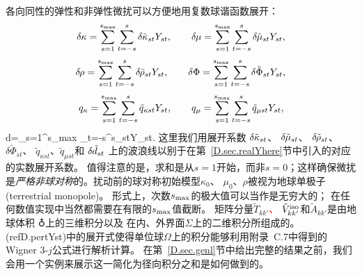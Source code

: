 各向同性的弹性和非弹性微扰可以方便地用复数球谐函数展开：
\begin{displaymath}
\delta\hspace{-0.1 mm}\kappa=\sum_{s=1}^{s_{\rm max}}
\sum_{t=-s}^s\delta\hspace{-0.1 mm}\tilde{\kappa}_{st}Y_{st},\qquad
\delta\hspace{-0.2 mm}\mu=\sum_{s=1}^{s_{\rm max}}
\sum_{t=-s}^s\delta\hspace{-0.2 mm}\tilde{\mu}_{st}Y_{st},
\end{displaymath}
\begin{displaymath}
\delta\hspace{-0.3 mm}\rho=\sum_{s=1}^{s_{\rm max}}
\sum_{t=-s}^s\delta\hspace{-0.3 mm}\tilde{\rho}_{st}Y_{st},\qquad
\delta\Phi=\sum_{s=1}^{s_{\rm max}}
\sum_{t=-s}^s\delta\tilde{\Phi}_{st}Y_{st},
\end{displaymath}
\begin{displaymath}
q_{\kappa}=\sum_{s=1}^{s_{\rm max}}
\sum_{t=-s}^s\tilde{q}_{\kappa st}Y_{st},\qquad
q_{\mu}=\sum_{s=1}^{s_{\rm max}}
\sum_{t=-s}^s\tilde{q}_{\mu st}Y_{st},
\end{displaymath}
\eq \label{D.pertYst}
\qquad\qquad\qquad
\delta\hspace{-0.1 mm}d=\sum_{s=1}^{s_{\rm max}}
\sum_{t=-s}^s\delta\hspace{-0.1 mm}_{st}Y_{st}.
\en
这里我们用展开系数
$\delta\hspace{-0.1 mm}\tilde{\kappa}_{st}$、
$\delta\hspace{-0.2 mm}\tilde{\mu}_{st}$、
$\delta\hspace{-0.3 mm}\tilde{\rho}_{st}$、
$\delta\tilde{\Phi}_{st}$、
$\tilde{q}_{\kappa st}$、$\tilde{q}_{\mu st}$和
$\delta\hspace{-0.1 mm}\tilde{d}_{st}$
上的波浪线以别于在第~\ref{D.sec.realYhere}节中引入的对应的实数展开系数。
值得注意的是，求和是从$s=1$开始，而非$s=0$；这样确保微扰是{\em 严格非球对称\/}的。扰动前的球对称初始模型$\kappa_0$、
$\mu_0$、$\rho$被视为地球单极子(terrestrial monopole)。
%
形式上，次数$s_{\rm max}$的极大值可以当作是无穷大的；
在任何数值实现中当然都需要在有限的$s_{\rm max}$值截断。
矩阵分量$\tilde{T}_{kk'}$\textcolor{red}{、}
$\tilde{V}_{kk'}^{\rm iso}$和$\tilde{A}_{kk'}$是由地球体积 $\earth$上的三维积分以及
在内、外界面$\Sigma$上的二维积分所组成的。
(ref{D.pertYst})中的展开式使得单位球$\Omega$上的积分能够利用附录~C.7中得到的Wigner 3-$j$公式进行解析计算。
在第~\ref{D.sec.genl}节中给出完整的结果之前，我们会用一个实例来展示这一简化为径向积分之和是如何做到的。
%
%

